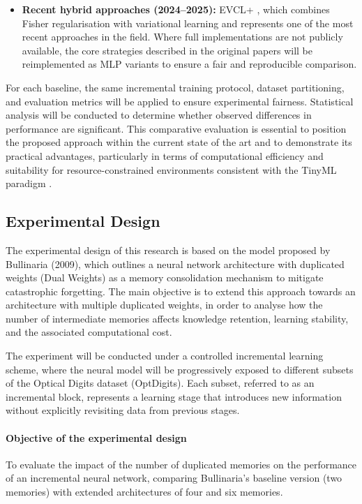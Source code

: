 \begin{enumerate}
\begin{itemize}
        \item \textbf{Recent hybrid approaches (2024--2025):} EVCL+ 
        \cite{sarkar2025adaptive}, which combines Fisher regularisation with 
        variational learning and represents one of the most recent approaches in 
        the field. Where full implementations are not publicly available, the core 
        strategies described in the original papers will be reimplemented as MLP 
        variants to ensure a fair and reproducible comparison.
    \end{itemize}
    For each baseline, the same incremental training protocol, dataset partitioning, 
    and evaluation metrics will be applied to ensure experimental fairness. Statistical 
    analysis will be conducted to determine whether observed differences in performance 
    are significant. This comparative evaluation is essential to position the proposed 
    approach within the current state of the art and to demonstrate its practical 
    advantages, particularly in terms of computational efficiency and suitability for 
    resource-constrained environments consistent with the TinyML paradigm 
    \cite{warden2019tinyml}.
\end{enumerate}

\subsection{Experimental Design}

The experimental design of this research is based on the model proposed by Bullinaria (2009), which outlines a neural network architecture with duplicated weights (Dual Weights) as a memory consolidation mechanism to mitigate catastrophic forgetting.  
The main objective is to extend this approach towards an architecture with multiple duplicated weights, in order to analyse how the number of intermediate memories affects knowledge retention, learning stability, and the associated computational cost.

The experiment will be conducted under a controlled incremental learning scheme, where the neural model will be progressively exposed to different subsets of the Optical Digits dataset (OptDigits).  
Each subset, referred to as an incremental block, represents a learning stage that introduces new information without explicitly revisiting data from previous stages.

\paragraph{Objective of the experimental design}
To evaluate the impact of the number of duplicated memories on the performance of an incremental neural network, comparing Bullinaria’s baseline version (two memories) with extended architectures of four and six memories.

